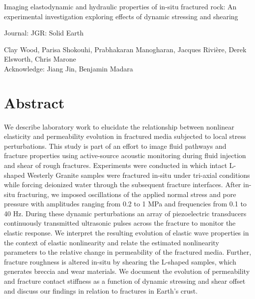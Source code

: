 \documentclass[letterpaper,10pt]{article}
\begin{document}

\doublespacing
\begin{center}
	\huge Imaging elastodynamic and hydraulic properties of in-situ fractured rock: An experimental investigation exploring effects of dynamic stressing and shearing

	\quad

	\large Journal: JGR: Solid Earth

	\quad

	\large Clay Wood, Parisa Shokouhi, Prabhakaran Manogharan, Jacques Rivi\`{e}re, Derek Elsworth, Chris Marone \\
	\large Acknowledge: Jiang Jin, Benjamin Madara

\end{center}
\clearpage





\section{Abstract}
\paragraph{}
We describe laboratory work to elucidate the relationship between nonlinear elasticity and permeability evolution in fractured media subjected to local stress perturbations. This study is part of an effort to image fluid pathways and fracture properties using active-source acoustic monitoring during fluid injection and shear of rough fractures. Experiments were conducted in which intact L-shaped Westerly Granite samples were fractured in-situ under tri-axial conditions while forcing deionized water through the subsequent fracture interfaces. After in-situ fracturing, we imposed oscillations of the applied normal stress and pore pressure with amplitudes ranging from 0.2 to 1 MPa and frequencies from 0.1 to 40 Hz. During these dynamic perturbations an array of piezoelectric transducers continuously transmitted ultrasonic pulses across the fracture to monitor the elastic response. We interpret the resulting evolution of elastic wave properties in the context of elastic nonlinearity and relate the estimated nonlinearity parameters to the relative change in permeability of the fractured media. Further, fracture roughness is altered in-situ by shearing the L-shaped samples, which generates breccia and wear materials. We document the evolution of permeability and fracture contact stiffness as a function of dynamic stressing and shear offset and discuss our findings in relation to fractures in Earth's crust.
\clearpage
\end{document}
